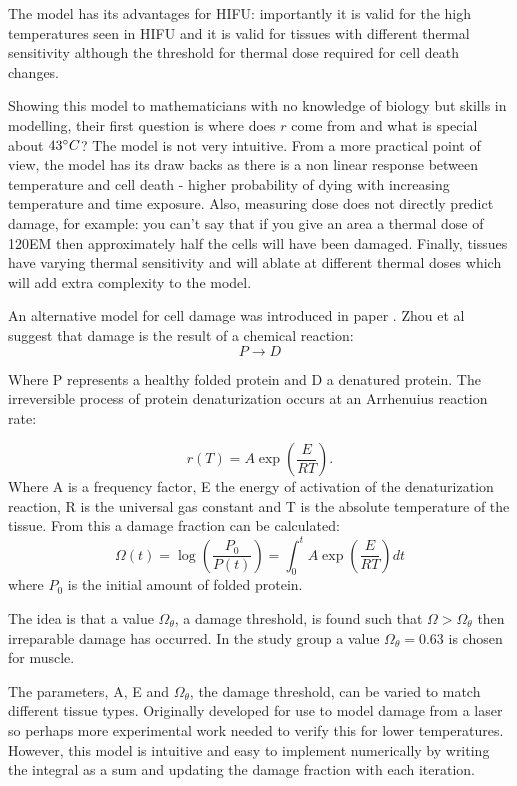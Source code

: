 \documentclass[11pt]{article} %
\begin{document}
	The model has its advantages for HIFU: importantly it is valid for the high temperatures seen in HIFU and it is valid for tissues with different thermal sensitivity although the threshold for thermal dose required for cell death changes. 
	
	Showing this model to mathematicians with no knowledge of biology but skills in modelling, their first question is where does $ r $ come from and what is special about $43 \degree C $? The model is not very intuitive. From a more practical point of view, the model has its draw backs as there is a non linear response between temperature and cell death - higher probability of dying with increasing temperature and time exposure. Also, measuring dose does not directly predict damage, for example: you can't say that if you give an area a thermal dose of 120EM then approximately half the cells will have been damaged. Finally, tissues have varying thermal sensitivity and will ablate at different thermal doses which will add extra complexity to the model.
	
		An alternative model for cell damage was introduced in  paper  \cite{Zhou2007}. Zhou et al suggest that damage is the result of a chemical reaction:
		\begin{equation}
		P\rightarrow D
		\end{equation}
		
		Where P represents a healthy folded protein and D a denatured protein. The irreversible process of protein denaturization occurs at an Arrhenuius reaction rate:
		
		\begin{equation}
			\boxed{r(T)=A\exp\left( \frac{E}{RT}\right) }.
		\end{equation}	
		Where A is a frequency factor, E the energy of activation of the denaturization reaction, R is the universal gas constant and T is the absolute temperature of the tissue. From this a damage fraction can be calculated:
		\begin{equation}
			\boxed{\Omega(t)=\log\left( \frac{P_0}{P(t)}\right) =\int_{0}^{t}A\exp\left( \frac{E}{RT}\right) dt}
		\end{equation}
		where $ P_0$ is the initial amount of folded protein.
		
		The idea is that a value $\Omega_\theta$, a damage threshold, is found such that $\Omega>\Omega_\theta$ then irreparable damage has occurred. In the study group a value $\Omega_\theta=0.63$ is chosen for muscle. 
		
		
	 	The parameters, A, E and $\Omega_\theta$, the damage threshold, can be varied to match different tissue types. Originally developed for use to model damage from a laser so perhaps more experimental work needed to verify this for lower temperatures. However, this model is intuitive and easy to implement numerically by writing the integral as a sum and updating the damage fraction with each iteration. 
	 	
\end{document}
